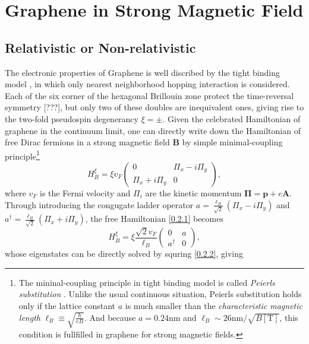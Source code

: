 \documentclass[bachelor,english,numbers]{ustcthesis}
\begin{document}
	\section{Graphene in Strong Magnetic Field}
	\subsection{Relativistic or Non-relativistic}
		\indent\par The electronic properties of Graphene is well discribed by the tight binding model \cite{altland2010condensed}, in which only nearest neighborhood hopping interaction is considered. Each of the six corner of the hexagonal Brillouin zone protect the time-reversal symmetry [???], but only two of these doubles are inequivalent ones, giving rise to the two-fold pseudospin degenerancy $\xi=\pm$. Given the celebrated Hamiltonian of graphene in the continuum limit, one can directly write down the Hamiltonian of free Dirac fermions in a strong magnetic field $\bm{B}$ by simple minimal-coupling principle\footnote{The mininal-coupling principle in tight binding model is called \emph{Peierls substitution} \cite{goerbig2011electronic}. Unlike the usual continuous situation, Peierls substitution holds only if the lattice constant $a$ is much smaller than the \emph{characteristic magnetic length} $\ell_B\equiv\sqrt{\frac{\hbar}{eB}}$. And because $a=0.24\mathrm{nm}$ and $\ell_B\sim26\mathrm{nm}/\sqrt{B[\mathrm{T}]}$, this condition is fullfilled in graphene for strong magnetic fields.} 
		\begin{equation}\label{0.2.1}
			H^\xi_B=\xi v_F\left(\begin{array}{cc}
				0 & \Pi_x-i\Pi_y\\
				\Pi_x+i\Pi_y & 0
			\end{array}\right),
		\end{equation}
		where $v_F$ is the Fermi velocity and $\Pi_i$ are the kinetic momentum $\bm{\Pi}=\bm{p}+e\bm{A}$. Through introducing the congugate ladder operator $a=\frac{\ell_B}{\sqrt{2}}(\Pi_x-i\Pi_y)$ and $a^\dagger=\frac{\ell_B}{\sqrt{2}}(\Pi_x+i\Pi_y)$, the free Hamiltonian \eqref{0.2.1} becomes 
		\begin{equation}\label{0.2.2}
			H^\xi_B=\xi\dfrac{\sqrt{2}v_F}{\ell_B}\left(\begin{array}{cc}
				0 & a \\ a^\dagger & 0
			\end{array}\right),
		\end{equation}
		whose eigenstates can be directly solved by squring \eqref{0.2.2}, giving \cite{tHoke2006fractional,tHoke20074}
\end{document}

